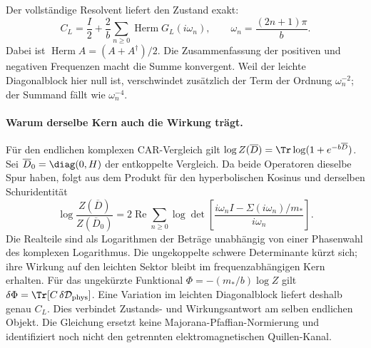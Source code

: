 Der vollständige Resolvent liefert den Zustand exakt:
\begin{equation}\label{eq:commonsourcekms}
\boxed{C_L=\frac I2+\frac2b\sum_{n\ge0}
\operatorname{Herm}G_L(i\omega_n),\qquad
\omega_n=\frac{(2n+1)\pi}{b}.}
\end{equation}
Dabei ist $\operatorname{Herm}A=(A+A^\dagger)/2$.
Die Zusammenfassung der positiven und negativen Frequenzen macht
die Summe konvergent. Weil der leichte Diagonalblock hier null ist,
verschwindet zusätzlich der Term der Ordnung $\omega_n^{-2}$;
der Summand fällt wie $\omega_n^{-4}$.

\begin{center}
\end{center}

\paragraph{Warum derselbe Kern auch die Wirkung trägt.}
Für den endlichen komplexen CAR-Vergleich gilt
$\log Z(\overline D)=\Tr\log(1+e^{-b\overline D})$.
Sei $\overline D_0=\diag(0,H)$ der entkoppelte Vergleich.
Da beide Operatoren dieselbe Spur haben, folgt aus dem Produkt für
den hyperbolischen Kosinus und derselben Schuridentität
\begin{equation}\label{eq:sourcekmsaction}
\log\frac{Z(\overline D)}{Z(\overline D_0)}
=2\operatorname{Re}\sum_{n\ge0}
\log\det\!\left[
\frac{i\omega_n I-\Sigma(i\omega_n)/m_*}{i\omega_n}
\right].
\end{equation}
Die Realteile sind als Logarithmen der Beträge unabhängig von
einer Phasenwahl des komplexen Logarithmus.
Die ungekoppelte schwere Determinante kürzt sich; ihre Wirkung auf
den leichten Sektor bleibt im frequenzabhängigen Kern erhalten.
Für das ungekürzte Funktional
$\Phi=-(m_*/b)\log Z$ gilt
$\delta\Phi=\Tr[C\,\delta\mathcal D_{\rm phys}]$.
Eine Variation im leichten Diagonalblock liefert deshalb genau $C_L$.
Dies verbindet Zustands- und Wirkungsantwort am selben endlichen Objekt.
Die Gleichung ersetzt keine Majorana-Pfaffian-Normierung und identifiziert
noch nicht den getrennten elektromagnetischen Quillen-Kanal.

